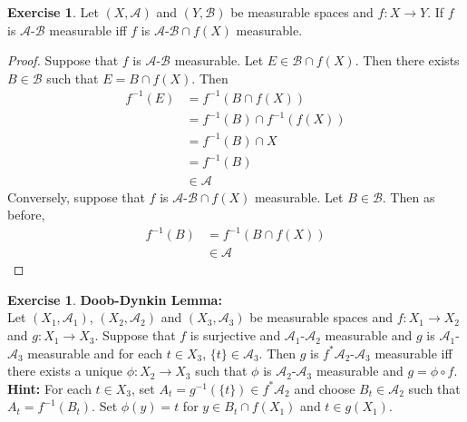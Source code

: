 \documentclass{book}
\theoremstyle{definition}
\newtheorem{ex}[definition]{Exercise}
\newcommand{\MA}{\mathcal{A}}
\newcommand{\MB}{\mathcal{B}}
\DeclareMathOperator*{\0}{\mbf{0}}
\DeclareMathOperator*{\1}{\mbf{1}}
\begin{document}
	\begin{ex}
		Let $(X, \MA)$ and $(Y, \MB)$ be measurable spaces and $f: X \rightarrow Y$. If $f$ is $\MA$-$\MB$ measurable iff $f$ is $\MA$-$\MB \cap f(X)$ measurable.
	\end{ex}	
	
	\begin{proof}
		Suppose that $f$ is $\MA$-$\MB$ measurable. Let $E \in \MB \cap f(X)$. Then there exists $B \in \MB$ such that $E = B \cap f(X)$. Then 
		\begin{align*}
			f^{-1}(E)
			&= f^{-1}(B \cap f(X)) \\
			&= f^{-1}(B) \cap f^{-1}(f(X)) \\
			&= f^{-1}(B) \cap X \\
			&= f^{-1}(B) \\
			& \in \MA
		\end{align*}
		Conversely, suppose that $f$ is  $\MA$-$\MB \cap f(X)$ measurable. Let $B \in \MB$. Then as before, 
		\begin{align*}
			f^{-1}(B) 
			&= f^{-1}(B \cap f(X))  \\
			& \in \MA 
		\end{align*}
	\end{proof}
	
	\begin{ex}\textbf{Doob-Dynkin Lemma:} \\
		Let $(X_1, \MA_1)$, $(X_2, \MA_2)$ and $(X_3, \MA_3)$ be measurable spaces and $f: X_1 \rightarrow X_2$ and $g:X_1 \rightarrow X_3$. Suppose that $f$ is surjective and $\MA_1$-$\MA_2$ measurable and $g$ is $\MA_1$-$\MA_3$ measurable and for each $t \in X_3$, $\{t\} \in \MA_3$. Then $g$ is $f^*\MA_2$-$\MA_3$ measurable iff there exists a unique $\phi: X_2 \rightarrow X_3$ such that $\phi$ is $\MA_2$-$\MA_3$ measurable and $g = \phi \circ f$. \\
		\textbf{Hint:} For each $t \in X_3$, set $A_t = g^{-1}(\{t\}) \in f^* \MA_2$ and choose $B_t \in \MA_2$ such that $A_t = f^{-1}(B_t)$. Set $\phi(y) = t$ for $y \in B_t \cap f(X_1)$ and $t \in g(X_1)$.
	\end{ex}
	
\end{document}
